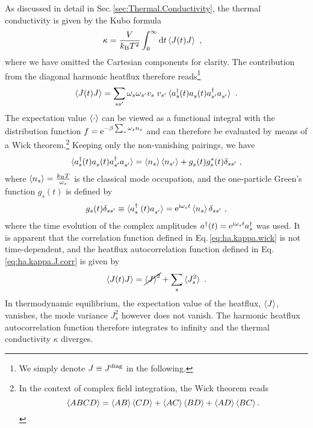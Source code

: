 As discussed in detail in Sec.\,\ref{sec:Thermal.Conductivity}, the thermal conductivity is given by the Kubo formula
\begin{align}
	\kappa
		&=
		\frac{V}{k_{\rm B} T^2} \int_{0}^{\infty} 
		{\rm d} t \braket{J (t) J} ~,
\end{align}
where we have omitted the Cartesian components for clarity.
The contribution from the diagonal harmonic heatflux therefore reads\footnote{We simply denote $J \equiv J^{\rm diag}$ in the following.}
\begin{align}
    \braket{J(t) J} = \sum_{ss'} \omega_s \omega_{s'} v_{\fP s} v_{s'}
	    \braket{\D a_s (t) \fD{a}_s (t) \D a_{s'} \fD a_{s'}}~.
	   \label{eq:ha.kappa.J.corr}
\end{align}
The expectation value $\braket{\cdot}$ can be viewed as a functional integral with the distribution function $f = {\rm e}^{-\beta \sum_s \omega_s n_s}$ and can therefore be evaluated by means of a Wick theorem.\footnote{In the context of complex field integration, the Wick theorem reads~\cite{Negele2018} $$\braket{ABCD} = \braket{AB}\braket{CD} + \braket{AC}\braket{BD} + \braket{AD}\braket{BC}.$$}
Keeping only the non-vanishing pairings, we have
\begin{align}
	\braket{\D a_s (t) \fD{a}_s (t) \D a_{s'} \fD a_{s'}}
		= \braket{n_s} \braket{n_{s'}} + \fD g_s (t) g^\ast_{s} (t) \delta_{ss'}~,
	\label{eq:ha.kappa.wick}
\end{align}
where $\braket{n_s} = \frac{k_{\rm B} T}{\omega_s}$
is the classical mode occupation, and the one-particle Green's function $g_s (t)$ is defined by
\begin{align}
	g_s (t) \delta_{ss'}
		\equiv \braket{\D{a}_{\fP s} (t) \fD{a}_{s'}} 
		= {\rm e}^{\im \omega_s t} \braket{n_s} \delta_{ss'}~,
\end{align}
where the time evolution of the complex amplitudes $a^{\dagger} (t) = {\rm e}^{{\rm i} \omega_s t} {a}^\dagger_s$ was used.
It is apparent that the correlation function defined in Eq.\,\eqref{eq:ha.kappa.wick} is not time-dependent, and the heatflux autocorrelation function defined in Eq.\,\eqref{eq:ha.kappa.J.corr} is given by
\begin{align}
	\braket{J (t) J} = \cancel{\braket{J}^2} + \sum_s \braket{J_s^2}~.
	\label{eq:ha.kappa.JJ}
\end{align}
In thermodynamic equilibrium, the expectation value of the heatflux, $\braket{J}$, vanishes, the mode variance $J_s^2$ however does not vanish. The harmonic heatflux autocorrelation function therefore integrates to infinity and the thermal conductivity $\kappa$ diverges.


